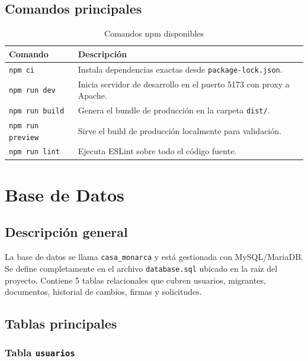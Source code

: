 \documentclass[10pt,letterpaper]{report}
\begin{document}
\section{Comandos principales}

\begin{table}[H]
\centering
\caption{Comandos npm disponibles}
\label{tab:comandos}
\begin{tabular}{p{} p{}}
\toprule
\textbf{Comando} & \textbf{Descripción} \\
\midrule
\texttt{npm ci} & Instala dependencias exactas desde \texttt{package-lock.json}. \\
\texttt{npm run dev} & Inicia servidor de desarrollo en el puerto 5173 con proxy a Apache. \\
\texttt{npm run build} & Genera el bundle de producción en la carpeta \texttt{dist/}. \\
\texttt{npm run preview} & Sirve el build de producción localmente para validación. \\
\texttt{npm run lint} & Ejecuta ESLint sobre todo el código fuente. \\
\bottomrule
\end{tabular}
\end{table}

\chapter{Base de Datos}

\section{Descripción general}

La base de datos se llama \texttt{casa\_monarca} y está gestionada con MySQL/MariaDB. Se define completamente en el archivo \texttt{database.sql} ubicado en la raíz del proyecto. Contiene 5 tablas relacionales que cubren usuarios, migrantes, documentos, historial de cambios, firmas y solicitudes.

\section{Tablas principales}

\subsection{Tabla \texttt{usuarios}}
\end{document}
